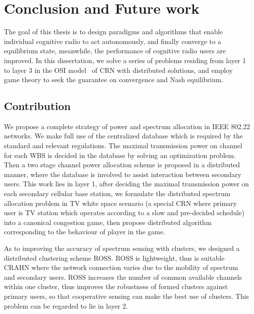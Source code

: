 \chapter{Conclusion and Future work}

The goal of this thesis is to design paradigms and algorithms that enable individual cognitive radio to act autonomously, and finally converge to a equilibrium state, meanwhile, the performance of cognitive radio users are improved.
In this dissertation, we solve a series of problems residing from layer 1 to layer 3 in the OSI model~\cite{osi} of CRN with distributed solutions, and employ game theory to seek the guarantee on convergence and Nash equilibrium.

\section{Contribution}
We propose a complete strategy of power and spectrum allocation in IEEE 802.22 networks.
We make full use of the centralized database which is required by the standard and relevant regulations.
The maximal transmission power on channel for each WBS is decided in the database by solving an optimization problem.
Then a two stage channel power allocation scheme is proposed in a distributed manner, where the database is involved to assist interaction between secondary users.
This work lies in layer 1, after deciding the maximal transmission power on each secondary cellular base station, we formulate the distributed spectrum allocation problem in TV white space scenario (a special CRN where primary user is TV station which operates according to a slow and pre-decided schedule) into a canonical congestion game, then propose distributed algorithm corresponding to the behaviour of player in the game.

As to improving the accuracy of spectrum sensing with clusters, we designed a distributed clustering scheme ROSS.
ROSS is lightweight, thus is suitable CRAHN where the network connection varies due to the mobility of spectrum and secondary users.
ROSS increases the number of common available channels within one cluster, thus improves the robustness of formed clusters against primary users, so that cooperative sensing can make the best use of clusters.
This problem can be regarded to lie in layer 2.

